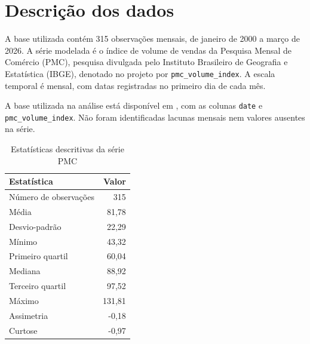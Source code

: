 ﻿\section{Descrição dos dados}

A base utilizada contém 315 observações mensais, de janeiro de 2000 a março de 2026. A série modelada é o índice de volume de vendas da Pesquisa Mensal de Comércio (PMC), pesquisa divulgada pelo Instituto Brasileiro de Geografia e Estatística (IBGE), denotado no projeto por \texttt{pmc\_volume\_index}. A escala temporal é mensal, com datas registradas no primeiro dia de cada mês.

A base utilizada na análise está disponível em , com as colunas \texttt{date} e \texttt{pmc\_volume\_index}. Não foram identificadas lacunas mensais nem valores ausentes na série.

\begin{table}[H]
\centering
\caption{Estatísticas descritivas da série PMC}
\begin{tabular}{lr}
\toprule
Estatística & Valor \\
\midrule
Número de observações & 315 \\
Média & 81,78 \\
Desvio-padrão & 22,29 \\
Mínimo & 43,32 \\
Primeiro quartil & 60,04 \\
Mediana & 88,92 \\
Terceiro quartil & 97,52 \\
Máximo & 131,81 \\
Assimetria & -0,18 \\
Curtose & -0,97 \\
\bottomrule
\end{tabular}
\end{table}

